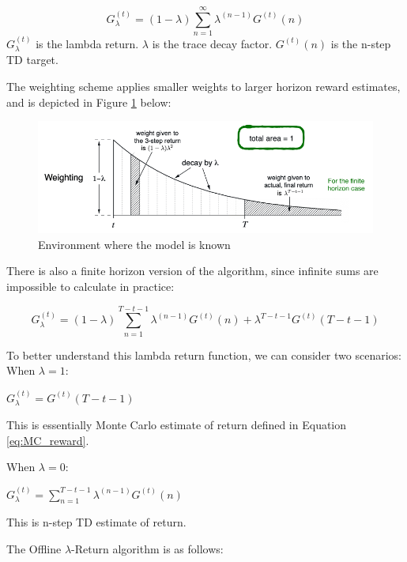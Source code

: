 \documentclass[11pt]{article}
\begin{document}
\begin{equation}
    G_{\lambda}^{(t)} =  (1 - \lambda) \sum\limits_{n=1}^\infty \lambda^{(n-1)} G^{(t)}(n)
\end{equation}
$G_{\lambda}^{(t)}$ is the lambda return. $\lambda$ is the trace decay factor. $G^{(t)}(n)$ is the n-step TD target.

The weighting scheme applies smaller weights to larger horizon reward estimates, and is depicted in Figure \ref{fig:lambda-return_weighting} below:

\begin{figure}[H]
    \centering
    \includegraphics[width=0.35\linewidth]{images/lambda-return_weighting.png}
    \caption{Environment where the model is known}
    \label{fig:lambda-return_weighting}
\end{figure}

There is also a finite horizon version of the algorithm, since infinite sums are impossible to calculate in practice:

\begin{equation}
    G_{\lambda}^{(t)} =  (1 - \lambda) \sum\limits_{n=1}^{T-t-1} \lambda^{(n-1)} G^{(t)}(n) + \lambda^{T-t-1}G^{(t)}(T-t-1)
\end{equation}

To better understand this lambda return function, we can consider two scenarios: \\ 
When $\lambda = 1$:
\begin{center}\begin{large}
    $G_{\lambda}^{(t)} =  G^{(t)}(T-t-1)$
\end{large}\end{center}
This is essentially Monte Carlo estimate of return defined in Equation \ref{eq:MC_reward}. 

When $\lambda = 0$:

\begin{center}\begin{large}
$G_{\lambda}^{(t)} = \sum\limits_{n=1}^{T-t-1} \lambda^{(n-1)} G^{(t)}(n)$
\end{large}\end{center}
This is n-step TD estimate of return.

The Offline $\lambda$-Return algorithm is as follows:
\end{document}
